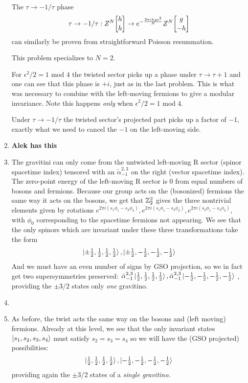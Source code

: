 \documentclass[11pt, class=article, crop=false]{standalone}
\begin{document}
\begin{enumerate}
	The $\tau \to -1/\tau$ phase
	\[
		\tau \to -1/\tau : Z^N\twist hh  \to e^{-\frac{2\pi i h g \epsilon^2}{N}} Z^N \twist{g}{-h}
	\]
	can similarly be proven from straightforward Poisson resummation. 
	
	This problem specializes to $N=2$.
	
	For $\epsilon^2/2=1 \text{ mod } 4$ the twisted sector picks up a phase under $\tau \to \tau +1$ and one can see that this phase is $+i$, just as in the last problem. This is what was necessary to combine with the left-moving fermions to give a modular invariance. Note this happens \emph{only} when $\epsilon^2/2 = 1 \text{ mod } 4$. 
	
	Under $\tau \to -1/\tau$ the twisted sector's projected part picks up a factor of $-1$, exactly what we need to cancel the $-1$ on the left-moving side.
	
	\item \textbf{Alek has this}
	
	\item The gravitini can only come from the untwisted left-moving R sector (spinor spacetime index) tensored with an $\tilde \alpha^{2,3}_{-1}$ on the right (vector spacetime index). The zero-point energy of the left-moving R sector is $0$ from equal numbers of bosons and fermions. Because our group acts on the (bosonized) fermions the same way it acts on the bosons, we get that $\mathbb{Z}_2^2$ gives the three nontrivial elements given by rotations $e^{2 \pi i (s_1 \phi_1 - s_2 \phi_2)}, e^{2 \pi i (s_1 \phi_1 - s_3 \phi_2)}, e^{2 \pi i (s_2 \phi_1 - s_3 \phi_2)}$, with $\phi_0$ corresponding to the spacetime fermions not appearing. We see that the only spinors which are invariant under these three transformations take the form
	\[
		\ket{\pm \tfrac12, \tfrac12, \tfrac12, \tfrac12}, \ket{\pm \tfrac12, -\tfrac12, -\tfrac12, -\tfrac12}
	\]
	And we must have an even number of signs by GSO projection, so we in fact get two supersymmetries preserved: $\tilde \alpha^{2,3}_{-1} \ket{\frac12,\frac12,\frac12,\frac12}, \tilde \alpha^{2,3}_{-1} \ket{-\frac12,-\frac12,-\frac12,-\frac12}$ , providing the $\pm 3/2$ states only \emph{one} gravitino. 
	
	\item 
	
	\item As before, the twist acts the same way on the bosons and (left moving) fermions. Already at this level, we see that the only invariant states $\ket{s_1, s_2, s_3, s_4}$ must satisfy $s_2 = s_3 = s_4$ so we will have the (GSO projected) possibilities:
	\[
		\ket{\tfrac12, \tfrac12, \tfrac12, \tfrac12}, \ket{-\tfrac12, -\tfrac12, -\tfrac12, -\tfrac12}
	\]
	providing again the $\pm 3/2$ states of a \emph{single gravitino}.
	

\end{enumerate}
\end{document}
